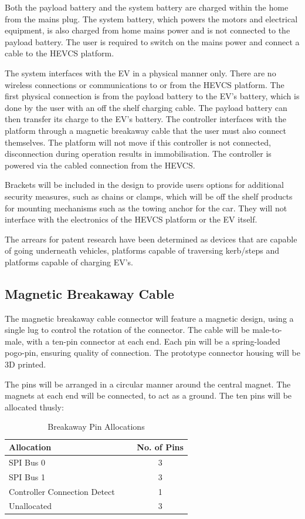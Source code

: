 \documentclass [12pt]{article}
\begin{document}
Both the payload battery and the system battery are charged within the home from the mains plug. The system battery, which powers the motors and electrical equipment, is also charged from home mains power and is not connected to the payload battery. The user is required to switch on the mains power and connect a cable to the HEVCS platform.

The system interfaces with the EV in a physical manner only. There are no wireless connections or communications to or from the HEVCS platform. The first physical connection is from the payload battery to the EV’s battery, which is done by the user with an off the shelf charging cable. The payload battery can then transfer its charge to the EV’s battery. The controller interfaces with the platform through a magnetic breakaway cable that the user must also connect themselves. The platform will not move if this controller is not connected, disconnection during operation results in immobilisation. The controller is powered via the cabled connection from the HEVCS.

Brackets will be included in the design to provide users options for additional security measures, such as chains or clamps, which will be off the shelf products for mounting mechanisms such as the towing anchor for the car. They will not interface with the electronics of the HEVCS platform or the EV itself.

The arrears for patent research have been determined as devices that are capable of going underneath vehicles, platforms capable of traversing kerb/steps and platforms capable of charging EV’s.

\subsection{Magnetic Breakaway Cable}

The magnetic breakaway cable connector will feature a magnetic design, using a single lug to control the rotation of the connector. The cable will be male-to-male, with a ten-pin connector at each end. Each pin will be a spring-loaded pogo-pin, ensuring quality of connection. The prototype connector housing will be 3D printed.

The pins will be arranged in a circular manner around the central magnet. The magnets at each end will be connected, to act as a ground. The ten pins will be allocated thusly:

\begin{table}[H]
    \centering
    \setlength{\arrayrulewidth}{1.5pt}
    \begin{tabular}{|p{0.7\linewidth}|c|}
    \hline
    \cellcolor{gray!40}Allocation & \cellcolor{gray!40}No. of Pins\\
    \hline
    SPI Bus 0 & 3 \\
    \hline
    SPI Bus 1 & 3 \\
    \hline
    Controller Connection Detect & 1 \\
    \hline
    Unallocated & 3 \\
   \hline
    \end{tabular}
    \caption{Breakaway Pin Allocations}
    \label{table:breakaway_pin_allocations}
\end{table}
\end{document}
